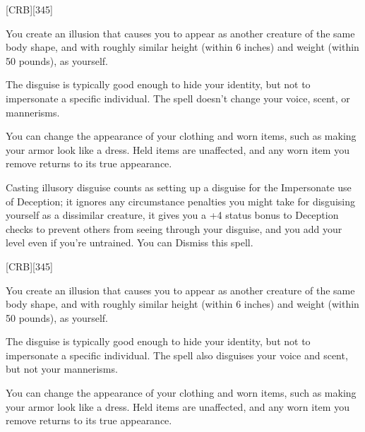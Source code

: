 
[CRB][345]



\bgroup
\engschrift\small

You create an illusion that causes you to appear as another creature of the same body shape,
and with roughly similar height (within 6 inches) and weight (within 50 pounds), as yourself.

The disguise is typically good enough to hide your identity, but not to impersonate a specific individual.
The spell doesn't change your voice, scent, or mannerisms.

You can change the appearance of your clothing and worn items, such as making your armor look like a dress.
Held items are unaffected, and any worn item you remove returns to its true appearance.

Casting illusory disguise counts as setting up a disguise for the Impersonate use of Deception;
it ignores any circumstance penalties you might take for disguising yourself as a dissimilar creature,
it gives you a +4 status bonus to Deception checks to prevent others from seeing through your disguise,
and you add your level even if you're untrained.
You can Dismiss this spell.

\egroup


[CRB][345]



\bgroup
\engschrift\small

You create an illusion that causes you to appear as another creature of the same body shape,
and with roughly similar height (within 6 inches) and weight (within 50 pounds), as yourself.

The disguise is typically good enough to hide your identity, but not to impersonate a specific individual.
The spell also disguises your voice and scent, but not your mannerisms.

You can change the appearance of your clothing and worn items, such as making your armor look like a dress.
Held items are unaffected, and any worn item you remove returns to its true appearance.

